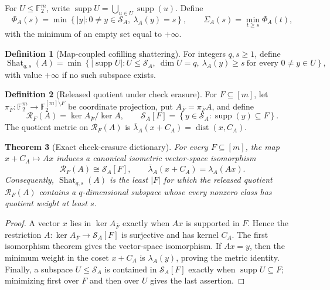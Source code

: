 \documentclass[11pt,letterpaper]{article}
\theoremstyle{plain}
\newtheorem{theorem}{Theorem}[section]
\theoremstyle{definition}
\newtheorem{definition}[theorem]{Definition}
\newcommand{\F}{\mathbb{F}_2}
\newcommand{\cR}{\mathcal{R}}
\newcommand{\cS}{\mathcal{S}}
\newcommand{\supp}{\operatorname{supp}}
\newcommand{\dist}{\operatorname{dist}}
\newcommand{\Shat}{\operatorname{Shat}}
\newcommand{\1}{\mathbf{1}}
\newcommand{\abs}[1]{\left|#1\right|}
\newcommand{\set}[1]{\left\{#1\right\}}
\begin{document}
For $U\le\F^m$, write $\supp U=\bigcup_{u\in U}\supp(u)$.  Define
\begin{equation}\label{eq:map-profiles}
 \Phi_A(s)=\min\set{\abs y:0\ne y\in\cS_A,\ \lambda_A(y)=s},
 \qquad
 \Sigma_A(s)=\min_{t\ge s}\Phi_A(t),
\end{equation}
with the minimum of an empty set equal to $+\infty$.

\begin{definition}[Map-coupled cofilling shattering]\label{def:map-shat}
For integers $q,s\ge1$, define
\begin{equation}\label{eq:map-shat}
 \Shat_{q,s}(A)=
 \min\set{\abs{\supp U}:U\le\cS_A,\ \dim U=q,\
 \lambda_A(y)\ge s\ \text{for every }0\ne y\in U},
\end{equation}
with value $+\infty$ if no such subspace exists.
\end{definition}

\begin{definition}[Released quotient under check erasure]
\label{def:released-quotient}
For $F\subseteq[m]$, let $\pi_{\bar F}:\F^m\to\F^{[m]\setminus F}$ be
coordinate projection, put $A_{\bar F}=\pi_{\bar F}A$, and define
\[
 \cR_F(A)=\ker A_{\bar F}/\ker A,
 \qquad
 \cS_A[F]=\set{y\in\cS_A:\supp(y)\subseteq F}.
\]
The quotient metric on $\cR_F(A)$ is
$\overline\lambda_A(x+C_A)=\dist(x,C_A)$.
\end{definition}

\begin{theorem}[Exact check-erasure dictionary]
\label{thm:general-erasure-dictionary}
For every $F\subseteq[m]$, the map $x+C_A\mapsto Ax$ induces a canonical
isometric vector-space isomorphism
\begin{equation}\label{eq:general-erasure-dictionary}
 \cR_F(A)\cong\cS_A[F],
 \qquad
 \overline\lambda_A(x+C_A)=\lambda_A(Ax).
\end{equation}
Consequently, $\Shat_{q,s}(A)$ is the least $|F|$ for which the released
quotient $\cR_F(A)$ contains a $q$-dimensional subspace whose every nonzero
class has quotient weight at least $s$.
\end{theorem}

\begin{proof}
A vector $x$ lies in $\ker A_{\bar F}$ exactly when $Ax$ is supported in
$F$.  Hence the restriction $A:\ker A_{\bar F}\to\cS_A[F]$ is surjective
and has kernel $C_A$.  The first isomorphism theorem gives the vector-space
isomorphism.  If $Ax=y$, then the minimum weight in the coset $x+C_A$ is
$\lambda_A(y)$, proving the metric identity.  Finally, a subspace
$U\le\cS_A$ is contained in $\cS_A[F]$ exactly when
$\supp U\subseteq F$; minimizing first over $F$ and then over $U$ gives the
last assertion.
\end{proof}
\end{document}
